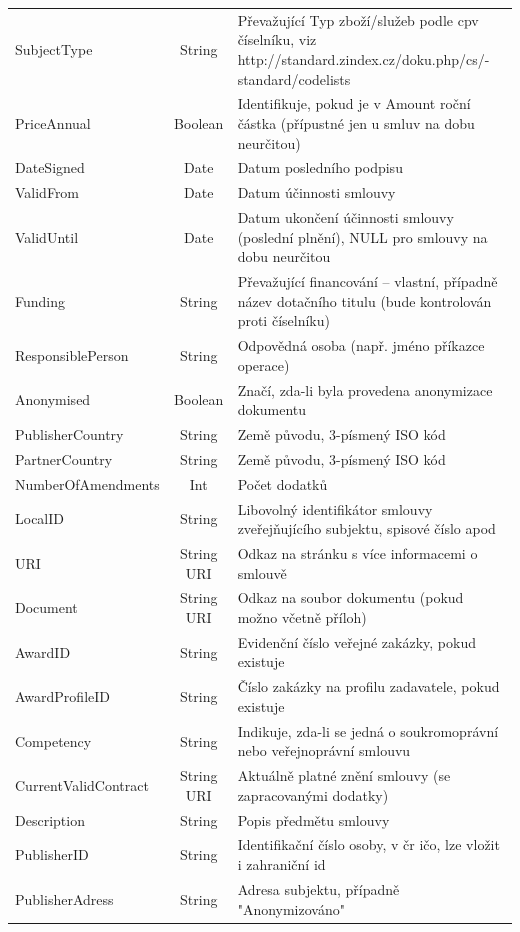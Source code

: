 \begin{center}
\begin{longtable}{lcp{65mm}}
SubjectType & String & Převažující Typ zboží/služeb podle cpv číselníku, viz http://standard.zindex.cz/doku.php/cs/- standard/codelists \\
PriceAnnual & Boolean & Identifikuje, pokud je v Amount roční částka (přípustné jen u smluv na dobu neurčitou) \\
\rowcolor{validateC}DateSigned & Date & Datum posledního podpisu \\
\rowcolor{validateC}ValidFrom & Date & Datum účinnosti smlouvy \\
\rowcolor{validateC}ValidUntil & Date & Datum ukončení účinnosti smlouvy (poslední plnění), NULL pro smlouvy na dobu neurčitou \\
Funding & String & Převažující financování – vlastní, případně název dotačního titulu (bude kontrolován proti číselníku) \\
ResponsiblePerson & String & Odpovědná osoba (např. jméno příkazce operace) \\
Anonymised & Boolean & Značí, zda-li byla provedena anonymizace dokumentu \\
\rowcolor{validateC}PublisherCountry & String & Země původu, 3-písmený ISO kód \\
\rowcolor{validateC}PartnerCountry & String & Země původu, 3-písmený ISO kód \\
NumberOfAmendments & Int & Počet dodatků \\
LocalID & String & Libovolný identifikátor smlouvy zveřejňujícího subjektu, spisové číslo apod \\
URI & String URI & Odkaz na stránku s více informacemi o smlouvě \\
Document & String URI & Odkaz na soubor dokumentu (pokud možno včetně příloh) \\
\rowcolor{validateC}AwardID & String & Evidenční číslo veřejné zakázky, pokud existuje \\
\rowcolor{validateC}AwardProfileID & String & Číslo zakázky na profilu zadavatele, pokud existuje \\
Competency & String & Indikuje, zda-li se jedná o soukromoprávní nebo veřejnoprávní smlouvu \\
CurrentValidContract & String URI & Aktuálně platné znění smlouvy (se zapracovanými dodatky) \\
Description & String & Popis předmětu smlouvy \\
\rowcolor{validateC}PublisherID & String & Identifikační číslo osoby, v čr ičo, lze vložit i zahraniční id \\
PublisherAdress & String & Adresa subjektu, případně "Anonymizováno" \\

\end{longtable}
\end{center}
